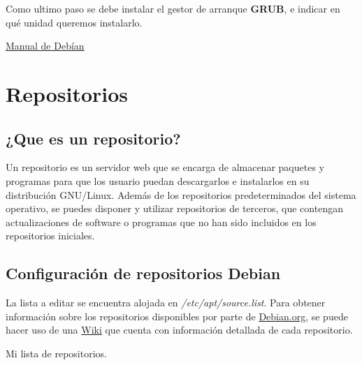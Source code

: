 				Como ultimo paso se debe instalar el gestor de arranque \textbf{GRUB}, e indicar en qué unidad queremos instalarlo.\par
			
				\begin{tcolorbox}[enhanced,attach boxed title to top center={yshift=-3mm,yshifttext=-1mm},colback=blue!5!white,colframe=blue!75!black,colbacktitle=red!80!black,title= Guía de Instalación,fonttitle=\bfseries, boxed title style={size=small,colframe=red!50!black}]
					
					\centering
					
					\href{https://debian-handbook.info/browse/es-ES/stable/sect.installation-steps.html/}{\color{blue}{}Manual de Debían}
					
				\end{tcolorbox}
	
	\section{Repositorios}
	
		\subsection{¿Que es un repositorio?}
		
			Un repositorio es un servidor web que se encarga de almacenar paquetes y programas para que los usuario puedan descargarlos e instalarlos en su distribución GNU/Linux. Además de los repositorios predeterminados del sistema operativo, se puedes disponer y utilizar repositorios de terceros, que contengan actualizaciones de software o programas que no han sido incluidos en los repositorios iniciales.\par
			
		\subsection{Configuración de repositorios Debian}

		La lista a editar se encuentra alojada en \textit{/etc/apt/source.list}. Para obtener información sobre los repositorios disponibles por parte de \href{https://www.debian.org}{\color{blue}{}Debian.org}, se puede hacer uso de una \href{https://wiki.debian.org/SourcesList/}{\color{blue}{}Wiki} que cuenta con información detallada de cada repositorio.\par
		
		Mi lista de repositorios.\par
			
